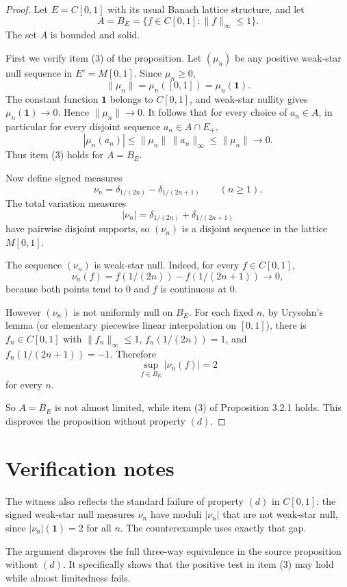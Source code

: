 \documentclass[11pt]{article}
\begin{document}
\begin{proof}
Let \(E=C[0,1]\) with its usual Banach lattice structure, and let
\[
  A=B_E=\{f\in C[0,1]: \|f\|_\infty\le1\}.
\]
The set \(A\) is bounded and solid.

First we verify item (3) of the proposition.  Let \((\mu_n)\) be any
positive weak-star null sequence in \(E'=M[0,1]\).  Since \(\mu_n\ge0\),
\[
  \|\mu_n\|=\mu_n([0,1])=\mu_n(\mathbf 1).
\]
The constant function \(\mathbf 1\) belongs to \(C[0,1]\), and weak-star
nullity gives \(\mu_n(\mathbf 1)\to0\).  Hence \(\|\mu_n\|\to0\).  It
follows that for every choice of \(a_n\in A\), in particular for every
disjoint sequence \(a_n\in A\cap E_+\),
\[
  |\mu_n(a_n)|\le \|\mu_n\|\,\|a_n\|_\infty\le \|\mu_n\|\to0.
\]
Thus item (3) holds for \(A=B_E\).

Now define signed measures
\[
  \nu_n=\delta_{1/(2n)}-\delta_{1/(2n+1)}\qquad (n\ge1).
\]
The total variation measures
\[
  |\nu_n|=\delta_{1/(2n)}+\delta_{1/(2n+1)}
\]
have pairwise disjoint supports, so \((\nu_n)\) is a disjoint sequence
in the lattice \(M[0,1]\).

The sequence \((\nu_n)\) is weak-star null.  Indeed, for every
\(f\in C[0,1]\),
\[
  \nu_n(f)=f(1/(2n))-f(1/(2n+1))\to0,
\]
because both points tend to \(0\) and \(f\) is continuous at \(0\).

However \((\nu_n)\) is not uniformly null on \(B_E\).  For each fixed
\(n\), by Urysohn's lemma (or elementary piecewise linear interpolation
on \([0,1]\)), there is \(f_n\in C[0,1]\) with
\(\|f_n\|_\infty\le1\), \(f_n(1/(2n))=1\), and
\(f_n(1/(2n+1))=-1\).  Therefore
\[
  \sup_{f\in B_E}|\nu_n(f)|=2
\]
for every \(n\).

So \(A=B_E\) is not almost limited, while item (3) of Proposition 3.2.1
holds.  This disproves the proposition without property \((d)\).
\end{proof}

\section*{Verification notes}

The witness also reflects the standard failure of property \((d)\) in
\(C[0,1]\): the signed weak-star null measures \(\nu_n\) have moduli
\(|\nu_n|\) that are not weak-star null, since
\(|\nu_n|(\mathbf 1)=2\) for all \(n\).  The counterexample uses exactly
that gap.

The argument disproves the full three-way equivalence in the source
proposition without \((d)\).  It specifically shows that the positive
test in item (3) may hold while almost limitedness fails.
\end{document}
